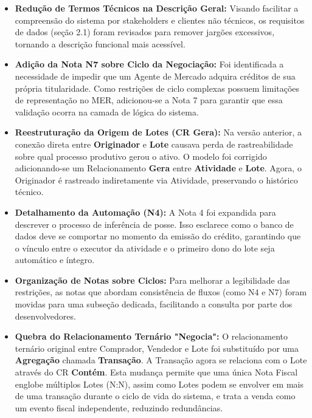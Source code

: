 \documentclass[12pt]{article}
\begin{document}
\begin{itemize}
    \item \textbf{Redução de Termos Técnicos na Descrição Geral:} Visando facilitar a compreensão do sistema por stakeholders e clientes não técnicos, os requisitos de dados (seção 2.1) foram revisados para remover jargões excessivos, tornando a descrição funcional mais acessível.
    
    \item \textbf{Adição da Nota N7 sobre Ciclo da Negociação:} Foi identificada a necessidade de impedir que um Agente de Mercado adquira créditos de sua própria titularidade. Como restrições de ciclo complexas possuem limitações de representação no MER, adicionou-se a Nota 7 para garantir que essa validação ocorra na camada de lógica do sistema.
    
    \item \textbf{Reestruturação da Origem de Lotes (CR Gera):} Na versão anterior, a conexão direta entre \textbf{Originador} e \textbf{Lote} causava perda de rastreabilidade sobre qual processo produtivo gerou o ativo. O modelo foi corrigido adicionando-se um Relacionamento \textbf{Gera} entre \textbf{Atividade} e \textbf{Lote}. Agora, o Originador é rastreado indiretamente via Atividade, preservando o histórico técnico.
    
    \item \textbf{Detalhamento da Automação (N4):} A Nota 4 foi expandida para descrever o processo de inferência de posse. Isso esclarece como o banco de dados deve se comportar no momento da emissão do crédito, garantindo que o vínculo entre o executor da atividade e o primeiro dono do lote seja automático e íntegro.
    
    \item \textbf{Organização de Notas sobre Ciclos:} Para melhorar a legibilidade das restrições, as notas que abordam consistência de fluxos (como N4 e N7) foram movidas para uma subseção dedicada, facilitando a consulta por parte dos desenvolvedores.
    
    \item \textbf{Quebra do Relacionamento Ternário "Negocia":} O relacionamento ternário original entre Comprador, Vendedor e Lote foi substituído por uma \textbf{Agregação} chamada \textbf{Transação}. A Transação agora se relaciona com o Lote através do CR \textbf{Contém}. Esta mudança permite que uma única Nota Fiscal englobe múltiplos Lotes (N:N), assim como Lotes podem se envolver em mais de uma transação durante o ciclo de vida do sistema, e trata a venda como um evento fiscal independente, reduzindo redundâncias.
    

\end{itemize}
\end{document}
